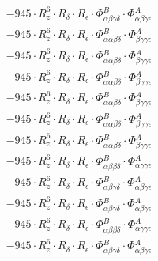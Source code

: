 \documentclass{article}
\begin{document}
\begin{subequations}
\begin{gather}
\begin{array}{c}
 \\[0.2em] 		 - 945 \cdot R_{z}^{6} \cdot R_{\delta{}} \cdot R_{\epsilon{}} \cdot \Phi{}^{B}_{\alpha{}\beta{}\gamma{}\delta{}} \cdot \Phi{}^{A}_{\alpha{}\beta{}\gamma{}\epsilon{}} 
 \\[0.2em] 		 - 945 \cdot R_{z}^{6} \cdot R_{\delta{}} \cdot R_{\epsilon{}} \cdot \Phi{}^{B}_{\alpha{}\alpha{}\beta{}\delta{}} \cdot \Phi{}^{A}_{\beta{}\gamma{}\gamma{}\epsilon{}} 
 \\[0.2em] 		 - 945 \cdot R_{z}^{6} \cdot R_{\delta{}} \cdot R_{\epsilon{}} \cdot \Phi{}^{B}_{\alpha{}\alpha{}\beta{}\delta{}} \cdot \Phi{}^{A}_{\beta{}\gamma{}\gamma{}\epsilon{}} 
 \\[0.2em] 		 - 945 \cdot R_{z}^{6} \cdot R_{\delta{}} \cdot R_{\epsilon{}} \cdot \Phi{}^{B}_{\alpha{}\alpha{}\beta{}\delta{}} \cdot \Phi{}^{A}_{\beta{}\gamma{}\gamma{}\epsilon{}} 
 \\[0.2em] 		 - 945 \cdot R_{z}^{6} \cdot R_{\delta{}} \cdot R_{\epsilon{}} \cdot \Phi{}^{B}_{\alpha{}\alpha{}\beta{}\delta{}} \cdot \Phi{}^{A}_{\beta{}\gamma{}\gamma{}\epsilon{}} 
 \\[0.2em] 		 - 945 \cdot R_{z}^{6} \cdot R_{\delta{}} \cdot R_{\epsilon{}} \cdot \Phi{}^{B}_{\alpha{}\alpha{}\beta{}\delta{}} \cdot \Phi{}^{A}_{\beta{}\gamma{}\gamma{}\epsilon{}} 
 \\[0.2em] 		 - 945 \cdot R_{z}^{6} \cdot R_{\delta{}} \cdot R_{\epsilon{}} \cdot \Phi{}^{B}_{\alpha{}\alpha{}\beta{}\delta{}} \cdot \Phi{}^{A}_{\beta{}\gamma{}\gamma{}\epsilon{}} 
 \\[0.2em] 		 - 945 \cdot R_{z}^{6} \cdot R_{\delta{}} \cdot R_{\epsilon{}} \cdot \Phi{}^{B}_{\alpha{}\beta{}\beta{}\delta{}} \cdot \Phi{}^{A}_{\alpha{}\gamma{}\gamma{}\epsilon{}} 
 \\[0.2em] 		 - 945 \cdot R_{z}^{6} \cdot R_{\delta{}} \cdot R_{\epsilon{}} \cdot \Phi{}^{B}_{\alpha{}\beta{}\gamma{}\delta{}} \cdot \Phi{}^{A}_{\alpha{}\beta{}\gamma{}\epsilon{}} 
 \\[0.2em] 		 - 945 \cdot R_{z}^{6} \cdot R_{\delta{}} \cdot R_{\epsilon{}} \cdot \Phi{}^{B}_{\alpha{}\beta{}\gamma{}\delta{}} \cdot \Phi{}^{A}_{\alpha{}\beta{}\gamma{}\epsilon{}} 
 \\[0.2em] 		 - 945 \cdot R_{z}^{6} \cdot R_{\delta{}} \cdot R_{\epsilon{}} \cdot \Phi{}^{B}_{\alpha{}\beta{}\beta{}\delta{}} \cdot \Phi{}^{A}_{\alpha{}\gamma{}\gamma{}\epsilon{}} 
 \\[0.2em] 		 - 945 \cdot R_{z}^{6} \cdot R_{\delta{}} \cdot R_{\epsilon{}} \cdot \Phi{}^{B}_{\alpha{}\beta{}\gamma{}\delta{}} \cdot \Phi{}^{A}_{\alpha{}\beta{}\gamma{}\epsilon{}} 

\end{array}
\end{gather}
\end{subequations}
\end{document}
